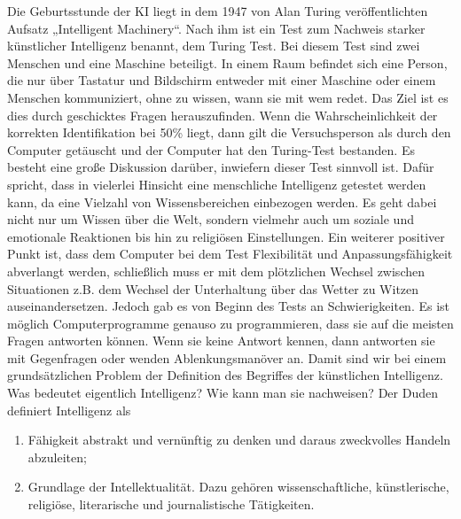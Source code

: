 Die Geburtsstunde der KI liegt in dem 1947 von Alan Turing veröffentlichten Aufsatz „Intelligent Machinery“. Nach ihm ist ein Test zum Nachweis starker künstlicher Intelligenz benannt, dem Turing Test. Bei diesem Test sind zwei Menschen und eine Maschine beteiligt. In einem Raum befindet sich eine Person, die nur über Tastatur und Bildschirm entweder mit einer Maschine oder einem Menschen kommuniziert, ohne zu wissen, wann sie mit wem redet. Das Ziel ist es dies durch geschicktes Fragen herauszufinden. Wenn die Wahrscheinlichkeit der korrekten Identifikation bei 50\% liegt, dann gilt die Versuchsperson als durch den Computer getäuscht und der Computer hat den Turing-Test bestanden.  Es besteht eine große Diskussion darüber, inwiefern dieser Test sinnvoll ist. Dafür spricht, dass in vielerlei Hinsicht eine menschliche Intelligenz getestet werden kann, da eine Vielzahl von Wissensbereichen einbezogen werden. Es geht dabei nicht nur um Wissen über die Welt, sondern vielmehr auch um soziale und emotionale Reaktionen bis hin zu religiösen Einstellungen. Ein weiterer positiver Punkt ist, dass dem Computer bei dem Test Flexibilität und Anpassungsfähigkeit abverlangt werden, schließlich muss er mit dem plötzlichen Wechsel zwischen Situationen z.B. dem Wechsel der Unterhaltung über das Wetter zu Witzen auseinandersetzen. Jedoch gab es von Beginn des Tests an Schwierigkeiten. Es ist möglich Computerprogramme genauso zu programmieren, dass sie auf die meisten Fragen antworten können. Wenn sie keine Antwort kennen, dann antworten sie mit Gegenfragen oder wenden Ablenkungsmanöver an. Damit sind wir bei einem grundsätzlichen Problem der Definition des Begriffes der künstlichen Intelligenz. Was bedeutet eigentlich Intelligenz? Wie kann man sie nachweisen? 
Der Duden definiert Intelligenz als
\begin{enumerate} \item Fähigkeit abstrakt und vernünftig zu denken und daraus zweckvolles Handeln abzuleiten;
\item Grundlage der Intellektualität. Dazu gehören wissenschaftliche, künstlerische, religiöse, literarische und journalistische Tätigkeiten. 
\end{enumerate}
